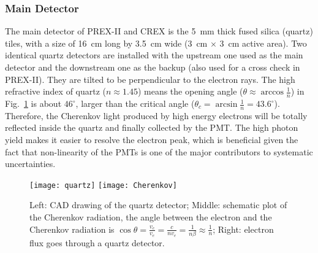 \subsubsection{Main Detector}
The main detector of PREX-II and CREX is the 5~mm thick fused silica (quartz) tiles,
with a size of 16~cm long by 3.5~cm wide (3~cm $\times$ 3~cm active area). 
Two identical quartz detectors are installed with the upstream one used as the 
main detector and the downstream one as the backup (also used for a cross check 
in PREX-II). They are tilted to be perpendicular to the electron rays.
The high refractive index of quartz ($n\approx 1.45$) means the opening angle ($\theta \approx \arccos\frac{1}{n}$)
in Fig.~\ref{fig:quartz} is about $46^\circ$, larger than the critical angle 
($\theta_c = \arcsin\frac{1}{n} = 43.6^\circ$).
Therefore, the Cherenkov light produced by high energy electrons will be totally
reflected inside the quartz and finally collected by the PMT. The high photon
yield makes it easier to resolve the electron peak, which is beneficial given
the fact that non-linearity of the PMTs is one of the major contributors to 
systematic uncertainties.
\begin{figure}[!h]
    \centering
    \texttt{[image: quartz]}
    \texttt{[image: Cherenkov]}
    \caption[quartz]{Left: CAD drawing of the quartz detector; 
    Middle: schematic plot of the Cherenkov radiation, the angle between 
    the electron and the Cherenkov radiation is 
    $\cos\theta = \frac{v_c}{v_e} = \frac{c}{nv_e} = \frac{1}{n\beta} \approx \frac{1}{n}$;
    Right: electron flux goes through a quartz detector.
    }
    \label{fig:quartz}
\end{figure}

